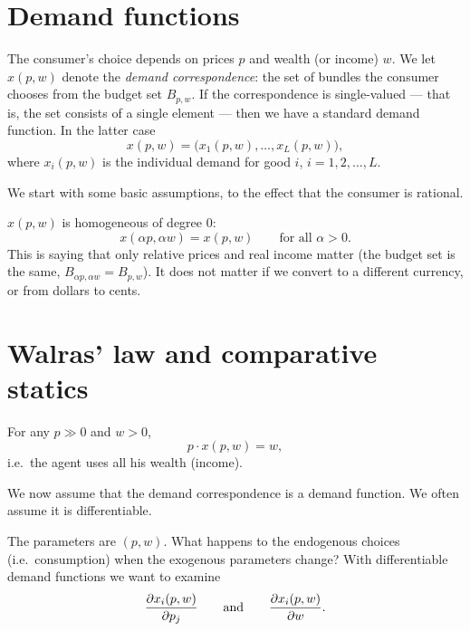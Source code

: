 \documentclass[11pt]{article}
\begin{document}


\section{Demand functions}

The consumer's choice depends on prices $p$ and wealth (or income) $w$. We let
$x(p,w)$ denote the \emph{demand correspondence}: the set of bundles the consumer
chooses from the budget set $B_{p,w}$. If the correspondence is single-valued --- that is, the
set consists of a single element --- then we have a standard demand function. In
the latter case
\[ x(p,w)=\bigl(x_1(p,w),\dots,x_L(p,w)\bigr), \]
where $x_i(p,w)$ is the individual demand for good $i$, $i=1,2,\dots,L$.

We start with some basic assumptions, to the effect that the consumer is rational.

$x(p,w)$ is homogeneous of degree 0:
\[ x(\alpha p,\alpha w)=x(p,w)\qquad\text{for all }\alpha>0. \]
This is saying that only relative prices and real income matter (the budget set
is the same, $B_{\alpha p,\alpha w}=B_{p,w}$). It does not matter if
we convert to a different currency, or from dollars to cents.

\section{Walras' law and comparative statics}

For any $p\gg 0$ and $w>0$,
\[ p\cdot x(p,w)=w, \]
i.e.\ the agent uses all his wealth (income).

We now assume that the demand correspondence is a demand function. We often assume
it is differentiable.

The parameters are $(p,w)$. What happens to the endogenous choices (i.e.\
consumption) when the exogenous parameters change? With differentiable demand
functions we want to examine
\[ \frac{\partial x_i(p,w)}{\partial p_j}\qquad\text{and}\qquad \frac{\partial x_i(p,w)}{\partial w}. \]
\end{document}
